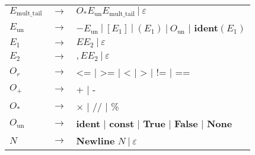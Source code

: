 \documentclass[a4paper, 12pt]{report}
\begin{document}
\begin{figure}[!h]
\begin{center}
{\begin{tabular}{lcl}
$E_\text{mult\_tail}$ & $\to$ & $O_* E_\text{un} E_\text{mult\_tail} \ | \ \varepsilon$\\
$E_\text{un}$ & $\to$ & $- E_\text{un} \ | \  [E_1] \ | \ (E_1) \ | \ O_\text{un}$ | \textbf{ident}$(E_1)$\\
$E_1$ & $\to$ & $E E_2 \ | \ \varepsilon$\\
$E_2$ & $\to$ & $, E E_2 \ | \ \varepsilon$\\
$O_r$ & $\to$ & <= | >= | < | > | != | ==\\
$O_+$ & $\to$ & + | -\\
$O_*$ & $\to$ & $\times$ | // | \%\\
$O_\text{un}$ & $\to$ &  \textbf{ident} | \textbf{const} | \textbf{True} | \textbf{False} | \textbf{None} \\
$N$ & $\to$ & \textbf{Newline} $N \ | \ \varepsilon$\\
\end{tabular}
}
\end{center}\end{figure}
\end{document}

